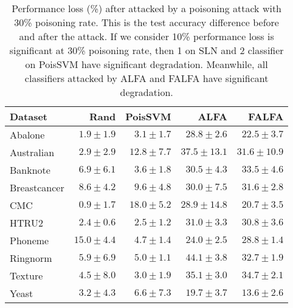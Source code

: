 \begin{table}
    \footnotesize
    \centering
    \caption{
        Performance loss (\%) after attacked by a poisoning attack with 30\% poisoning rate. 
        This is the test accuracy difference before and after the attack. 
        If we consider 10\% performance loss is significant at 30\% poisoning rate, then 1 on SLN and 2 classifier on PoisSVM have significant degradation. 
        Meanwhile, all classifiers attacked by ALFA and FALFA have significant degradation.
    }
    \begin{tabular}{l|r|r|r|r}
        \toprule
        Dataset &         Rand &      PoisSVM &          ALFA &         FALFA \\
    \midrule
        Abalone &  $1.9\pm1.9$ &  $3.1\pm1.7$ &  $\bm{28.8\pm2.6}$ &  $\bm{22.5\pm3.7}$ \\
        Australian &  $2.9\pm2.9$ & $\bm{12.8\pm7.7}$ & $\bm{37.5\pm13.1}$ & $\bm{31.6\pm10.9}$ \\
        Banknote &  $6.9\pm6.1$ &  $3.6\pm1.8$ &  $\bm{30.5\pm4.3}$ &  $\bm{33.5\pm4.6}$ \\
    Breastcancer &  $8.6\pm4.2$ &  $9.6\pm4.8$ &  $\bm{30.0\pm7.5}$ &  $\bm{31.6\pm2.8}$ \\
            CMC &  $0.9\pm1.7$ & $\bm{18.0\pm5.2}$ & $\bm{28.9\pm14.8}$ &  $\bm{20.7\pm3.5}$ \\
            HTRU2 &  $2.4\pm0.6$ &  $2.5\pm1.2$ &  $\bm{31.0\pm3.3}$ &  $\bm{30.8\pm3.6}$ \\
        Phoneme & $\bm{15.0\pm4.4}$ &  $4.7\pm1.4$ &  $\bm{24.0\pm2.5}$ &  $\bm{28.8\pm1.4}$ \\
        Ringnorm &  $5.9\pm6.9$ &  $5.0\pm1.1$ &  $\bm{44.1\pm3.8}$ &  $\bm{32.7\pm1.9}$ \\
        Texture &  $4.5\pm8.0$ &  $3.0\pm1.9$ &  $\bm{35.1\pm3.0}$ &  $\bm{34.7\pm2.1}$ \\
            Yeast &  $3.2\pm4.3$ &  $6.6\pm7.3$ &  $\bm{19.7\pm3.7}$ &  $\bm{13.6\pm2.6}$ \\
    \bottomrule
    \end{tabular}
    \label{tab.err}
\end{table}



